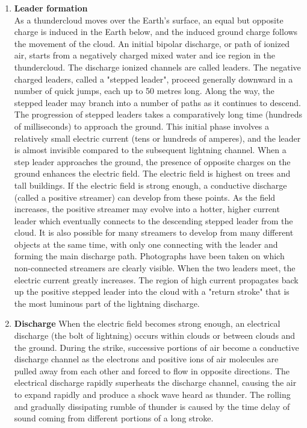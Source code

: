 {\begin {enumerate}
\item \textbf{Leader formation}\\
As a thundercloud moves over the Earth's surface, an equal but opposite charge
is induced in the Earth below, and the induced ground charge follows the
movement of the cloud. 
An initial bipolar discharge, or path of ionized air, starts from a negatively
charged mixed water and ice region in the thundercloud. The discharge ionized
channels are called leaders. The negative charged leaders, called a "stepped
leader", proceed generally downward in a number of quick jumps, each up to 50
metres long. Along the way, the stepped leader may branch into a number of paths
as it continues to descend. The progression of stepped leaders takes a
comparatively long time (hundreds of milliseconds) to approach the ground. This
initial phase involves a relatively small electric current (tens or hundreds of
amperes), and the leader is almost invisible compared to the subsequent
lightning channel. 
When a step leader approaches the ground, the presence of opposite charges on
the ground enhances the electric field. The electric field is highest on trees
and tall buildings. If the electric field is strong enough, a conductive
discharge (called a positive streamer) can develop from these points. As the
field increases, the positive streamer may evolve into a hotter, higher current
leader which eventually connects to the descending stepped leader from the
cloud. It is also possible for many streamers to develop from many different
objects at the same time, with only one connecting with the leader and forming the
main discharge path. Photographs have been taken on which non-connected
streamers are clearly visible. When the two leaders meet, the electric current
greatly increases. The region of high current propagates back up the positive
stepped leader into the cloud with a "return stroke" that is the most luminous
part of the lightning discharge.\\
\item \textbf{Discharge}
When the electric field becomes strong enough, an electrical discharge (the bolt
of lightning) occurs within clouds or between clouds and the ground. During the
strike, successive portions of air become a conductive discharge channel as the
electrons and positive ions of air molecules are pulled away from each other and
forced to flow in opposite directions. 
The electrical discharge rapidly superheats the discharge channel, causing the
air to expand rapidly and produce a shock wave heard as thunder. The rolling and
gradually dissipating rumble of thunder is caused by the time delay of sound
coming from different portions of a long stroke.  
\end{enumerate}}

